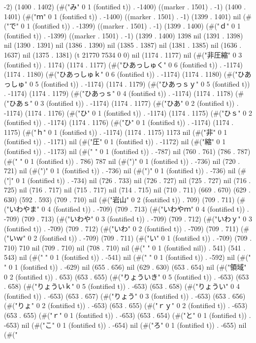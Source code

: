 -2) (1400 . 1402) (#("み" 0 1 (fontified t)) . -1400) ((marker . 1501) . -1) (1400 . 1401) (#("ｍ" 0 1 (fontified t)) . -1400) ((marker . 1501) . -1) (1399 . 1401) nil (#("で" 0 1 (fontified t)) . -1399) ((marker . 1501) . -1) (1399 . 1400) (#("ｄ" 0 1 (fontified t)) . -1399) ((marker . 1501) . -1) (1399 . 1400) 1398 nil (1391 . 1398) nil (1390 . 1391) nil (1386 . 1390) nil (1385 . 1387) nil (1381 . 1385) nil (1636 . 1637) nil (1375 . 1381) (t 21770 7534 0 0) nil (1174 . 1177) nil (#("非圧縮" 0 3 (fontified t)) . 1174) (1174 . 1177) (#("ひあっしゅく" 0 6 (fontified t)) . -1174) (1174 . 1180) (#("ひあっしゅｋ" 0 6 (fontified t)) . -1174) (1174 . 1180) (#("ひあっしゅ" 0 5 (fontified t)) . -1174) (1174 . 1179) (#("ひあっｓｙ" 0 5 (fontified t)) . -1174) (1174 . 1179) (#("ひあっｓ" 0 4 (fontified t)) . -1174) (1174 . 1178) (#("ひあｓ" 0 3 (fontified t)) . -1174) (1174 . 1177) (#("ひあ" 0 2 (fontified t)) . -1174) (1174 . 1176) (#("ひ" 0 1 (fontified t)) . -1174) (1174 . 1175) (#("ひｓ" 0 2 (fontified t)) . -1174) (1174 . 1176) (#("ひ" 0 1 (fontified t)) . -1174) (1174 . 1175) (#("ｈ" 0 1 (fontified t)) . -1174) (1174 . 1175) 1173 nil (#("非" 0 1 (fontified t)) . -1171) nil (#("圧" 0 1 (fontified t)) . -1172) nil (#("縮" 0 1 (fontified t)) . -1173) nil (#("
" 0 1 (fontified t)) . -787) nil (760 . 761) (786 . 787) (#(" " 0 1 (fontified t)) . 786) 787 nil (#(")" 0 1 (fontified t)) . -736) nil (720 . 721) nil (#(")" 0 1 (fontified t)) . -736) nil (#(")" 0 1 (fontified t)) . -736) nil (#("]" 0 1 (fontified t)) . -734) nil (726 . 733) nil (726 . 727) nil (725 . 727) nil (716 . 725) nil (716 . 717) nil (715 . 717) nil (714 . 715) nil (710 . 711) (669 . 670) (629 . 630) (592 . 593) (709 . 710) nil (#("岩山" 0 2 (fontified t)) . 709) (709 . 711) (#("いわやま" 0 4 (fontified t)) . -709) (709 . 713) (#("いわやｍ" 0 4 (fontified t)) . -709) (709 . 713) (#("いわや" 0 3 (fontified t)) . -709) (709 . 712) (#("いわｙ" 0 3 (fontified t)) . -709) (709 . 712) (#("いわ" 0 2 (fontified t)) . -709) (709 . 711) (#("いｗ" 0 2 (fontified t)) . -709) (709 . 711) (#("い" 0 1 (fontified t)) . -709) (709 . 710) 710 nil (709 . 710) nil (708 . 710) nil (#(" " 0 1 (fontified nil)) . 541) (541 . 543) nil (#("
" 0 1 (fontified t)) . -541) nil (#("
" 0 1 (fontified t)) . -592) nil (#("
" 0 1 (fontified t)) . -629) nil (655 . 656) nil (629 . 630) (653 . 654) nil (#("領域" 0 2 (fontified t)) . 653) (653 . 655) (#("りょういき" 0 5 (fontified t)) . -653) (653 . 658) (#("りょういｋ" 0 5 (fontified t)) . -653) (653 . 658) (#("りょうい" 0 4 (fontified t)) . -653) (653 . 657) (#("りょう" 0 3 (fontified t)) . -653) (653 . 656) (#("りょ" 0 2 (fontified t)) . -653) (653 . 655) (#("ｒｙ" 0 2 (fontified t)) . -653) (653 . 655) (#("ｒ" 0 1 (fontified t)) . -653) (653 . 654) (#("と" 0 1 (fontified t)) . -653) nil (#("こ" 0 1 (fontified t)) . -654) nil (#("ろ" 0 1 (fontified t)) . -655) nil (#("
